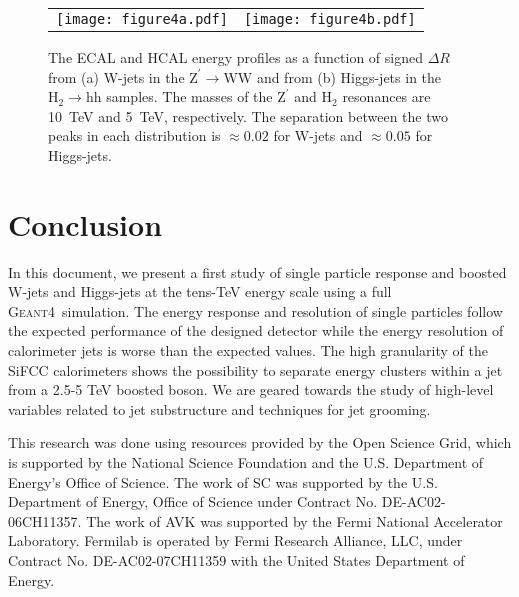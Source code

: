 \documentclass{PoS}
\newcommand{\GEANTfour} {{\textsc{Geant4}}}
\begin{document}
\begin{figure}
\begin{center}
\begin{tabular}{cc}
\texttt{[image: figure4a.pdf]} &
\texttt{[image: figure4b.pdf]}\\
\end{tabular}
\end{center}
\caption{
The ECAL and HCAL energy profiles as a function of signed $\Delta R$ from 
(a) W-jets in the $\mathrm{Z}^{\prime}\rightarrow \mathrm{WW}$ and 
from (b) Higgs-jets in the $\mathrm{H}_2\rightarrow \mathrm{hh}$ 
samples. The masses of the $\mathrm{Z}^{\prime}$ and $\mathrm{H}_2$ resonances 
are 10~TeV and 5~TeV, respectively. The separation between the two peaks in 
each distribution is $\approx 0.02$ for W-jets and $\approx 0.05$ for 
Higgs-jets. }
\label{fig:angular}
\end{figure}


\section{Conclusion}
In this document, we present a first study of single particle response and 
boosted W-jets and Higgs-jets at the tens-TeV energy scale using a full 
\GEANTfour\ simulation. The 
energy response and resolution of single particles follow the expected 
performance of the designed detector while the energy resolution of 
calorimeter jets is worse than the expected values. 
The high granularity of the SiFCC calorimeters 
shows the possibility to separate energy 
clusters within a jet from a 2.5-5 TeV boosted boson. We are geared towards 
the study of high-level variables related to jet substructure and techniques 
for jet grooming.

\acknowledgments 
 This research was done using resources provided by the Open Science Grid,
which is supported by the National Science Foundation and the U.S.
Department of Energy's Office of Science. The work of SC was supported by 
the U.S. Department of Energy, Office of Science under Contract No. 
DE-AC02-06CH11357. The work of AVK was supported by the Fermi National Accelerator Laboratory.
Fermilab is operated by Fermi Research Alliance, LLC, under Contract No. DE-AC02-07CH11359 with 
the United States Department of Energy.
\end{document}

